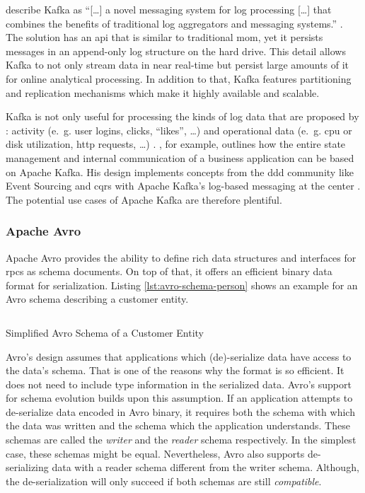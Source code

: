 \citeauthor{kreps_kafka_2011} describe Kafka as \enquote{[\ldots] a novel messaging system for log processing [\ldots] that combines the benefits of traditional log aggregators and messaging systems.} \parencite{kreps_kafka_2011}.
The solution has an \gls{api} that is similar to traditional \gls{mom}, yet it persists messages in an append-only log structure on the hard drive.
This detail allows Kafka to not only stream data in near real-time but persist large amounts of it for online analytical processing.
In addition to that, Kafka features partitioning and replication mechanisms which make it highly available and scalable. \parencite{kreps_kafka_2011}

Kafka is not only useful for processing the kinds of log data that are proposed by \citeauthor{kreps_kafka_2011}: activity (e.~g. user logins, clicks, \enquote{likes}, \ldots) and operational data (e.~g. \gls{cpu} or disk utilization, \gls{http} requests, \ldots) \parencite{kreps_kafka_2011}.
\citeauthor{stopford_designing_2018}, for example, outlines how the entire state management and internal communication of a business application can be based on Apache Kafka.
His design implements concepts from the \gls{ddd} community like Event Sourcing \parencite{fowler_event_sourcing_2005} and \gls{cqrs} \parencite{fowler_cqrs_2011} with Apache Kafka's log-based messaging at the center \parencite{stopford_designing_2018}.
The potential use cases of Apache Kafka are therefore plentiful.

\subsubsection{Apache Avro}\label{sec:avro}

Apache Avro provides the ability to define rich data structures and interfaces for \glspl{rpc} as schema documents.
On top of that, it offers an efficient binary data format for serialization.
Listing \ref{lst:avro-schema-person} shows an example for an Avro schema describing a customer entity.
\parencite{apache_software_foundation_apache_2021}

\begin{listing}[H]
  \inputminted{json}{assets/src/Customer.avsc}
  \caption{Simplified Avro Schema of a Customer Entity}\label{lst:avro-schema-person}
\end{listing}

Avro's design assumes that applications which (de)-serialize data have access to the data's schema.
That is one of the reasons why the format is so efficient.
It does not need to include type information in the serialized data.
Avro's support for schema evolution builds upon this assumption.
If an application attempts to de-serialize data encoded in Avro binary, it requires both the schema with which the data was written and the schema which the application understands.
These schemas are called the \emph{writer} and the \emph{reader} schema respectively.
In the simplest case, these schemas might be equal.
Nevertheless, Avro also supports de-serializing data with a reader schema different from the writer schema.
Although, the de-serialization will only succeed if both schemas are still \emph{compatible}.
\parencite{apache_software_foundation_apache_2021}

